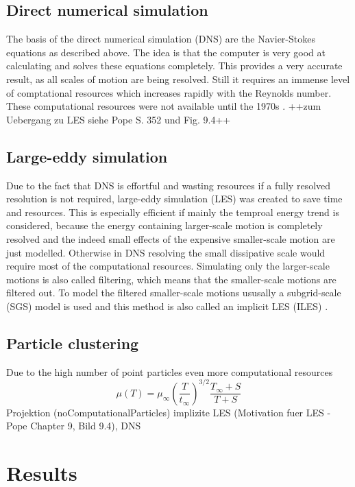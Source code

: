 \documentclass[a4paper,10pt]{article}
\numberwithin{equation}{section} %
\begin{document}
\subsection{Direct numerical simulation}
The basis of the direct numerical simulation (DNS) are the Navier-Stokes equations as described above. The idea is that the computer is very good at calculating and solves these equations completely. This provides a very accurate result, as all scales of motion are being resolved. Still it requires an immense level of comptational resources which increases rapidly with the Reynolds number. These computational resources were not available until the 1970s \cite{turbulentFlows}. ++zum Uebergang zu LES siehe Pope S. 352 und Fig. 9.4++
\subsection{Large-eddy simulation}
Due to the fact that DNS is effortful and wasting resources if a fully resolved resolution is not required, large-eddy simulation (LES) was created to save time and resources. This is especially efficient if mainly the temproal energy trend is considered, because the energy containing larger-scale motion is completely resolved and the indeed small effects of the expensive smaller-scale motion are just modelled. Otherwise in DNS resolving the small dissipative scale would require most of the computational resources.
\newline
Simulating only the larger-scale motions is also called filtering, which means that the smaller-scale motions are filtered out. To model the filtered smaller-scale motions ususally a subgrid-scale (SGS) model is used and this method is also called an implicit LES (ILES) \cite{turbulentFlows}. %
\subsection{Particle clustering}
Due to the high number of point particles even more computational resources 
\pagebreak
\newline
\begin{equation}
 \mu (T) = \mu_\infty (\frac{T}{t_\infty})^{3/2} \frac{T_\infty + S}{T + S}
\end{equation}
Projektion (noComputationalParticles)
implizite LES (Motivation fuer LES -  Pope Chapter 9, Bild 9.4), DNS
\pagebreak
\section{Results}
\end{document}

